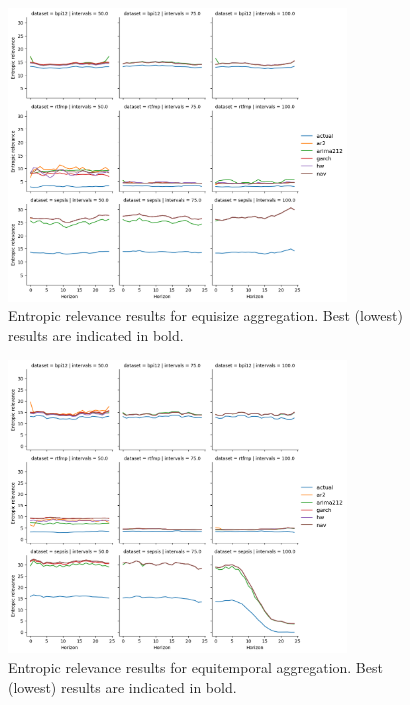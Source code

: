 \begin{figure}
    \centering
    \includegraphics[width=0.8\textwidth]{img/cv_entropic_small_equisize.png}
    \caption{Entropic relevance results for equisize aggregation. Best (lowest) results are indicated in bold.}
    \label{fig:equisize}
\end{figure}
\begin{figure}
    \centering
    \includegraphics[width=0.8\textwidth]{img/cv_entropic_small_equitemp.png}
    \caption{Entropic relevance results for equitemporal aggregation. Best (lowest) results are indicated in bold.}
    \label{fig:equitemp}
\end{figure}

